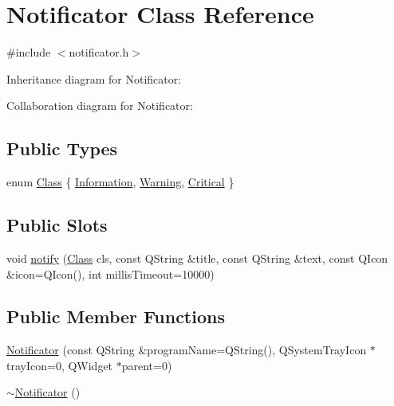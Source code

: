 \hypertarget{class_notificator}{}\section{Notificator Class Reference}
\label{class_notificator}


{\ttfamily \#include $<$notificator.\+h$>$}



Inheritance diagram for Notificator\+:


Collaboration diagram for Notificator\+:
\subsection*{Public Types}
\begin{DoxyCompactItemize}
\item 
enum \hyperlink{class_notificator_aa2ff8a05d471e32e77584a2b8dd182ab}{Class} \{ \hyperlink{class_notificator_aa2ff8a05d471e32e77584a2b8dd182aba195b01e918cc724c6ad65f5037e85f83}{Information}, 
\hyperlink{class_notificator_aa2ff8a05d471e32e77584a2b8dd182abac33ad19811d3b1d6b57305dd75d63a5e}{Warning}, 
\hyperlink{class_notificator_aa2ff8a05d471e32e77584a2b8dd182aba596518f9cfdbd57b0fdc68fc95c69ecd}{Critical}
 \}
\end{DoxyCompactItemize}
\subsection*{Public Slots}
\begin{DoxyCompactItemize}
\item 
void \hyperlink{class_notificator_ae08e1e7e85ddc4690f307649021f7fdc}{notify} (\hyperlink{class_notificator_aa2ff8a05d471e32e77584a2b8dd182ab}{Class} cls, const Q\+String \&title, const Q\+String \&text, const Q\+Icon \&icon=Q\+Icon(), int millis\+Timeout=10000)
\end{DoxyCompactItemize}
\subsection*{Public Member Functions}
\begin{DoxyCompactItemize}
\item 
\hyperlink{class_notificator_a160ee34ea7ce46bd20d5684504f53509}{Notificator} (const Q\+String \&program\+Name=Q\+String(), Q\+System\+Tray\+Icon $\ast$tray\+Icon=0, Q\+Widget $\ast$parent=0)
\item 
\hyperlink{class_notificator_a38d79072ff215da9214047c9a8d27e58}{$\sim$\+Notificator} ()
\end{DoxyCompactItemize}


